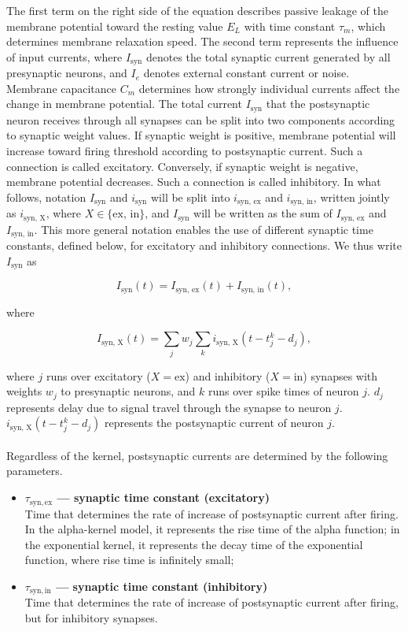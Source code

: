 \documentclass[a4paper,12pt,openright]{book}
\begin{document}
The first term on the right side of the equation describes passive leakage of the membrane potential toward the resting value $E_L$ with time constant $\tau_m$, which determines membrane relaxation speed. The second term represents the influence of input currents, where $I_{\text{syn}}$ denotes the total synaptic current generated by all presynaptic neurons, and $I_e$ denotes external constant current or noise. Membrane capacitance $C_m$ determines how strongly individual currents affect the change in membrane potential. The total current $I_{\text{syn}}$ that the postsynaptic neuron receives through all synapses can be split into two components according to synaptic weight values. If synaptic weight is positive, membrane potential will increase toward firing threshold according to postsynaptic current. Such a connection is called excitatory. Conversely, if synaptic weight is negative, membrane potential decreases. Such a connection is called inhibitory. In what follows, notation $I_{\text{syn}}$ and $i_{\text{syn}}$ will be split into $i_{\text{syn, ex}}$ and $i_{\text{syn, in}}$, written jointly as $i_{\text{syn, X}}$, where $X \in \{\text{ex, in}\}$, and $I_{\text{syn}}$ will be written as the sum of $I_{\text{syn, ex}}$ and $I_{\text{syn, in}}$. This more general notation enables the use of different synaptic time constants, defined below, for excitatory and inhibitory connections. We thus write $I_{\text{syn}}$ as

\[
I_{\text{syn}}(t) = I_{\text{syn, ex}}(t) + I_{\text{syn, in}}(t) ,
\]

\noindent where

\[
I_{\text{syn, X}}(t) = \sum_j w_j \sum_k i_{\text{syn, X}}(t - t_j^k - d_j) ,
\]

\noindent where $j$ runs over excitatory ($X = \text{ex}$) and inhibitory ($X = \text{in}$) synapses with weights $w_j$ to presynaptic neurons, and $k$ runs over spike times of neuron $j$. $d_j$ represents delay due to signal travel through the synapse to neuron $j$. $i_{\text{syn, X}}(t - t_j^k - d_j)$ represents the postsynaptic current of neuron $j$. \\ 
\\
Regardless of the kernel, postsynaptic currents are determined by the following parameters.

\begin{itemize}
    \item \textbf{$\tau_{\mathrm{syn,ex}}$ --- synaptic time constant (excitatory)} \\
    Time that determines the rate of increase of postsynaptic current after firing. In the alpha-kernel model, it represents the rise time of the alpha function; in the exponential kernel, it represents the decay time of the exponential function, where rise time is infinitely small;

    \item \textbf{$\tau_{\mathrm{syn,in}}$ --- synaptic time constant (inhibitory)} \\
    Time that determines the rate of increase of postsynaptic current after firing, but for inhibitory synapses.
\end{itemize}
\end{document}

